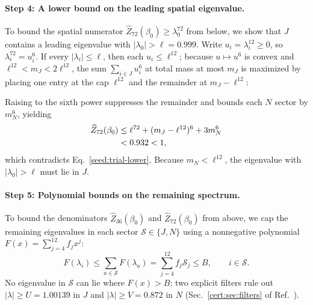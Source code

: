 \paragraph{Step 4: A lower bound on the leading spatial eigenvalue.}
To bound the spatial numerator $\widehat Z_{72}(\beta_0)\ge\lambda_0^{72}$
from below, we show that $J$ contains a leading eigenvalue with
$|\lambda_0|>\ell=0.999$. Write $u_i=\lambda_i^{12}\ge0$, so
$\lambda_i^{72}=u_i^6$. If every $|\lambda_i|\le\ell$, then each
$u_i\le\ell^{12}$; because $u\mapsto u^6$ is convex and
$\ell^{12}<m_J<2\ell^{12}$, the sum $\sum_{i\in J}u_i^6$ at total mass
at most $m_J$ is maximized by placing one entry at the cap $\ell^{12}$
and the remainder at $m_J-\ell^{12}$:
\begin{proofdiagram}
 \seedweightbars
\end{proofdiagram}
Raising to the sixth power suppresses the remainder and bounds each
$N$ sector by $m_N^6$, yielding
\begin{align}
 \widehat Z_{72}(\beta_0)
 &\le\ell^{72}+(m_J-\ell^{12})^6+3m_N^6\notag\\
 &<0.932<1,
 \label{seed:dominance}
\end{align}
which contradicts Eq.~\eqref{seed:trial-lower}. Because
$m_N<\ell^{12}$, the eigenvalue with $|\lambda_0|>\ell$ must lie in $J$.

\paragraph{Step 5: Polynomial bounds on the remaining spectrum.}
To bound the denominators $\widehat Z_{36}(\beta_0)$ and
$\widehat Z_{72}(\beta_0)$ from above, we cap the remaining
eigenvalues in each sector $\mathcal S\in\{J,N\}$ using a nonnegative
polynomial $F(x)=\sum_{j=4}^{12}f_jx^j$:
\begin{equation}
 F(\lambda_i)\le\sum_{a\in\mathcal S}F(\lambda_a)
 =\sum_{j=4}^{12}f_j\mathcal S_j\le B,
 \qquad i\in\mathcal S.
 \label{seed:filter}
\end{equation}
No eigenvalue in $\mathcal S$ can lie where $F(x)>B$; two explicit
filters rule out $|\lambda|\ge U=1.00139$ in $J$ and
$|\lambda|\ge V=0.872$ in $N$ (Sec.~\ref{cert:sec:filters} of
Ref.~\cite{SM}).

